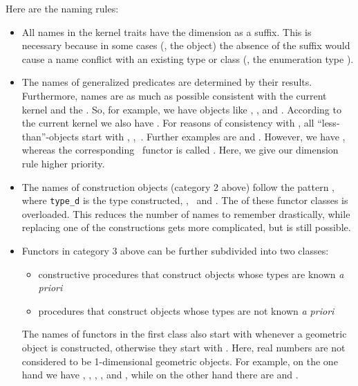 Here are the naming rules:
\begin{itemize}
\item All names in the kernel traits have the dimension as a suffix.
      This is necessary because in some cases (\eg, the 
      object) the absence of the suffix would cause a name conflict with
      an existing type or class (\eg, the enumeration type ).
    \item The names of generalized predicates are determined by their
      results.  Furthermore, names are as much as possible consistent
      with the current kernel and the \stl. So, for example, we have
      objects like , ,
      and .  According to the current kernel we
      also have .  For reasons of consistency with
      \stl, all ``less-than''-objects start with ,
      \eg,~.  Further examples are
       and
      . However, we have ,
      whereas the corresponding \stl\ functor is called
      . Here, we give our dimension rule higher
      priority.
    \item The names of construction objects (category 2 above) follow
      the pattern , where \texttt{type\_d}
      is the type constructed, \eg,~ and
      .  The  of these functor
      classes is overloaded.  This reduces the number of names to
      remember drastically, while replacing one of the constructions
      gets more complicated, but is still possible.
    \item Functors in category 3 above can be further subdivided into
      two classes:
      \begin{itemize}
         \item constructive procedures that construct objects whose types are
               known {\em a priori}
         \item procedures that construct objects whose types are not known
               {\em a priori}
      \end{itemize}

      The names of functors in the first class also start with
       whenever a geometric object is constructed,
      otherwise they start with .  Here, real numbers
      are not considered to be 1-dimensional geometric objects.  For
      example, on the one hand we have
      ,
      , ,
      , and ,
      while on the other hand there are  and
      .


\end{itemize}
